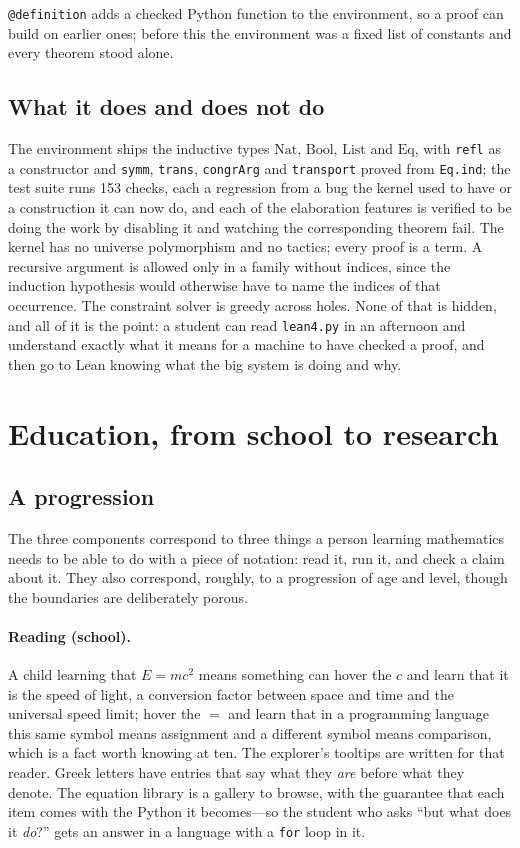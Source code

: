 \documentclass[11pt]{article}
\begin{document}
\verb|@definition| adds a checked Python function to the environment, so a
proof can build on earlier ones; before this the environment was a fixed list
of constants and every theorem stood alone.

\subsection{What it does and does not do}

The environment ships the inductive types $\mathrm{Nat}$, $\mathrm{Bool}$,
$\mathrm{List}$ and $\mathrm{Eq}$, with \verb|refl| as a constructor and
\verb|symm|, \verb|trans|, \verb|congrArg| and \verb|transport| proved from
\verb|Eq.ind|; the test suite runs 153 checks, each a regression from a bug the
kernel used to have or a construction it can now do, and each of the
elaboration features is verified to be doing the work by disabling it and
watching the corresponding theorem fail. The kernel has no universe
polymorphism and no tactics; every proof is a term. A recursive argument is
allowed only in a family without indices, since the induction hypothesis would
otherwise have to name the indices of that occurrence. The constraint solver is
greedy across holes. None of that is hidden, and all of it is the point: a
student can read \texttt{lean4.py} in an afternoon and understand exactly what
it means for a machine to have checked a proof, and then go to Lean knowing
what the big system is doing and why.

\section{Education, from school to research}
\label{sec:education}

\subsection{A progression}

The three components correspond to three things a person learning mathematics
needs to be able to do with a piece of notation: read it, run it, and check a
claim about it. They also correspond, roughly, to a progression of age and
level, though the boundaries are deliberately porous.

\paragraph{Reading (school).} A child learning that $E = mc^2$ means something
can hover the $c$ and learn that it is the speed of light, a conversion factor
between space and time and the universal speed limit; hover the $=$ and learn
that in a programming language this same symbol means assignment and a
different symbol means comparison, which is a fact worth knowing at ten. The
explorer's tooltips are written for that reader. Greek letters have entries
that say what they \emph{are} before what they denote. The equation library is
a gallery to browse, with the guarantee that each item comes with the Python it
becomes---so the student who asks ``but what does it \emph{do}?'' gets an
answer in a language with a \verb|for| loop in it.
\end{document}
